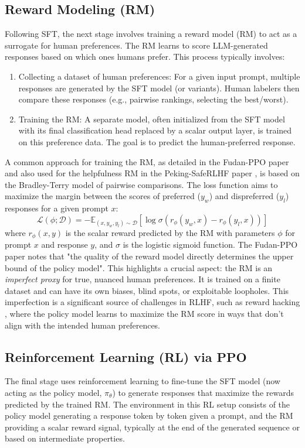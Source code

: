 \documentclass{article}
\begin{document}
\subsection{Reward Modeling (RM)}
Following SFT, the next stage involves training a reward model (RM) to act as a surrogate for human preferences. The RM learns to score LLM-generated responses based on which ones humans prefer. This process typically involves:
\begin{enumerate}
    \item Collecting a dataset of human preferences: For a given input prompt, multiple responses are generated by the SFT model (or variants). Human labelers then compare these responses (e.g., pairwise rankings, selecting the best/worst). \cite{Zheng2023PPO}
    \item Training the RM: A separate model, often initialized from the SFT model with its final classification head replaced by a scalar output layer, is trained on this preference data. The goal is to predict the human-preferred response.
\end{enumerate}
A common approach for training the RM, as detailed in the Fudan-PPO paper \cite{Zheng2023PPO} and also used for the helpfulness RM in the Peking-SafeRLHF paper \cite{Dai2023SafeRLHF}, is based on the Bradley-Terry model of pairwise comparisons. The loss function aims to maximize the margin between the scores of preferred ($y_w$) and dispreferred ($y_l$) responses for a given prompt $x$:
\begin{equation}
    \label{eq:pairwise_loss}
    \mathcal{L}(\phi;\mathcal{D}) = -\mathbb{E}_{(x,y_w,y_l)\sim\mathcal{D}}[\log \sigma(r_\phi(y_w,x) - r_\phi(y_l,x))]
\end{equation}
    where $r_\phi(x,y)$ is the scalar reward predicted by the RM with parameters $\phi$ for prompt $x$ and response $y$, and $\sigma$ is the logistic sigmoid function. The Fudan-PPO paper notes that "the quality of the reward model directly determines the upper bound of the policy model". \cite{Zheng2023PPO} This highlights a crucial aspect: the RM is an \textit{imperfect proxy} for true, nuanced human preferences. It is trained on a finite dataset and can have its own biases, blind spots, or exploitable loopholes. This imperfection is a significant source of challenges in RLHF, such as reward hacking \cite{Zhang2024EnergyLoss}, where the policy model learns to maximize the RM score in ways that don't align with the intended human preferences.

\subsection{Reinforcement Learning (RL) via PPO}
The final stage uses reinforcement learning to fine-tune the SFT model (now acting as the policy model, $\pi_\theta$) to generate responses that maximize the rewards predicted by the trained RM. The environment in this RL setup consists of the policy model generating a response token by token given a prompt, and the RM providing a scalar reward signal, typically at the end of the generated sequence or based on intermediate properties.
\end{document}
